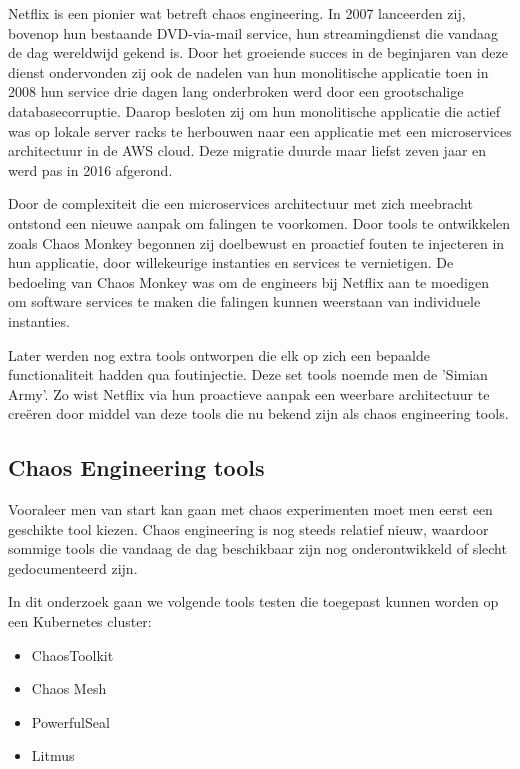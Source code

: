 Netflix is een pionier wat betreft chaos engineering. In 2007 lanceerden zij, bovenop hun bestaande DVD-via-mail service, hun streamingdienst die vandaag de dag wereldwijd gekend is. Door het groeiende succes in de beginjaren van deze dienst ondervonden zij ook de nadelen van hun monolitische applicatie toen in 2008 hun service drie dagen lang onderbroken werd door een grootschalige databasecorruptie. 
Daarop besloten zij om hun monolitische applicatie die actief was op lokale server racks te herbouwen naar een applicatie met een microservices architectuur in de AWS cloud. Deze migratie duurde maar liefst zeven jaar en werd pas in 2016 afgerond.

Door de complexiteit die een microservices architectuur met zich meebracht ontstond een nieuwe aanpak om falingen te voorkomen. Door tools te ontwikkelen zoals Chaos Monkey begonnen zij doelbewust en proactief fouten te injecteren in hun applicatie, door willekeurige instanties en services te vernietigen. De bedoeling van Chaos Monkey was om de engineers bij Netflix aan te moedigen om software services te maken die falingen kunnen weerstaan van individuele instanties. \autocite{Basiri2016}  

Later werden nog extra tools ontworpen die elk op zich een bepaalde functionaliteit hadden qua foutinjectie. Deze set tools noemde men de 'Simian Army'. Zo wist Netflix via hun proactieve aanpak een weerbare architectuur te creëren door middel van deze tools die nu bekend zijn als chaos engineering tools.

\subsection{Chaos Engineering tools}

Vooraleer men van start kan gaan met chaos experimenten moet men eerst een geschikte tool kiezen. Chaos engineering is nog steeds relatief nieuw, waardoor sommige tools die vandaag de dag beschikbaar zijn nog onderontwikkeld of slecht gedocumenteerd zijn.

In dit onderzoek gaan we volgende tools testen die toegepast kunnen worden op een Kubernetes cluster: 
\begin{itemize}
    \item ChaosToolkit
    \item Chaos Mesh
    \item PowerfulSeal 
    \item Litmus
\end{itemize} 

